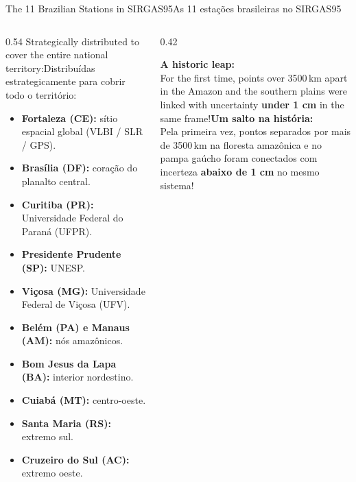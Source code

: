 \documentclass[aspectratio=169,11pt]{beamer}
\newcommand{\tr}[2]{\ifEN#2\else#1\fi}
\newcommand{\bnum}[1]{\ifmmode\textcolor{mTeal}{\mathbf{#1}}\else\textbf{\textcolor{mTeal}{#1}}\fi}
\begin{document}
\begin{frame}{\tr{As 11 estações brasileiras no SIRGAS95}{The 11 Brazilian Stations in SIRGAS95}}
  \begin{columns}[onlytextwidth]
    \begin{column}{0.54\textwidth}
      \scriptsize
      \tr{Distribuídas estrategicamente para cobrir todo o território:}{Strategically distributed
      to cover the entire national territory:}
      \begin{itemize}
        \setlength{\itemsep}{2pt}
        \tiny
        \item \textbf{Fortaleza (CE):} sítio espacial global (VLBI / SLR / GPS).
        \item \textbf{Brasília (DF):} coração do planalto central.
        \item \textbf{Curitiba (PR):} Universidade Federal do Paraná (UFPR).
        \item \textbf{Presidente Prudente (SP):} UNESP.
        \item \textbf{Viçosa (MG):} Universidade Federal de Viçosa (UFV).
        \item \textbf{Belém (PA) e Manaus (AM):} nós amazônicos.
        \item \textbf{Bom Jesus da Lapa (BA):} interior nordestino.
        \item \textbf{Cuiabá (MT):} centro-oeste.
        \item \textbf{Santa Maria (RS):} extremo sul.
        \item \textbf{Cruzeiro do Sul (AC):} extremo oeste.
      \end{itemize}
    \end{column}
    \begin{column}{0.42\textwidth}
      \begin{ideia}
        \scriptsize
        \tr{\textbf{Um salto na história:}\\[3pt]
        Pela primeira vez, pontos separados por mais de \num{3500}\,km na floresta amazônica e no
        pampa gaúcho foram conectados com incerteza \bnum{abaixo de 1 cm} no mesmo sistema!}{\textbf{A
        historic leap:}\\[3pt]
        For the first time, points over \num{3500}\,km apart in the Amazon and the southern plains
        were linked with uncertainty \bnum{under 1 cm} in the same frame!}
      \end{ideia}
    \end{column}
  \end{columns}
\end{frame}
\end{document}
